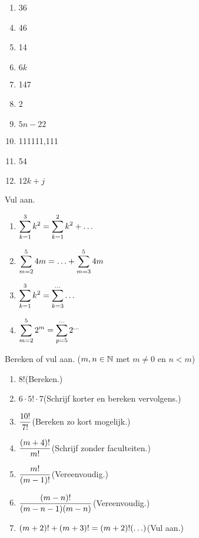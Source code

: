 \documentclass{ximera}
\begin{document}
\begin{oefening2}
\begin{opl}
\begin{minipage}[t]{.24\textwidth}
\begin{enumerate}
\item 36
\end{enumerate}
\end{minipage}
\begin{minipage}[t]{.24\textwidth}
\begin{enumerate}\setcounter{enumi}{3}
\item 46
\item 14
\item $6k$
\end{enumerate}
\end{minipage}
\begin{minipage}[t]{.27\textwidth}
\begin{enumerate}\setcounter{enumi}{6}
\item 147
\item 2
\item $5n-22$
\end{enumerate}
\end{minipage}
\begin{minipage}[t]{.25\textwidth}
\begin{enumerate}\setcounter{enumi}{9}
\item 111111,111
\item 54
\item $12k+j$
\end{enumerate}
\end{minipage}
\end{opl}


\end{oefening2}


\begin{oefening2}
Vul aan.
\begin{enumerate}
\item $\displaystyle{\sum^3_{k=1}k^2=\sum^2_{k=1}k^2+\ldots}$
\item $\displaystyle{\sum^5_{m=2}4m=\ldots+\sum^5_{m=3}4m}$
\item $\displaystyle{\sum^3_{k=1}k^2=\sum^{\ldots}_{k=3}\ldots}$
\item $\displaystyle{\sum^5_{m=2}2^m=\sum^{\ldots}_{p=5}2^{\ldots}}$
\end{enumerate}
\end{oefening2}

\begin{oefening2} Bereken of vul aan. ($m,n\in\mathbb{N}$ met $m\neq 0$ en $n<m$)
\begin{enumerate}
\item $8!$\quad(Bereken.)
\item $6\cdot5!\cdot 7$\quad(Schrijf korter en bereken vervolgens.)
\item $\displaystyle{\frac{10!}{7!}}$\quad(Bereken zo kort mogelijk.)
\item $\displaystyle{\frac{(m+4)!}{m!}}$\quad(Schrijf zonder faculteiten.)
\item $\displaystyle{\frac{m!}{(m-1)!}}$\quad(Vereenvoudig.)
\item $\displaystyle{\frac{(m-n)!}{(m-n-1)(m-n)}}$\quad(Vereenvoudig.)
\item $\displaystyle{(m+2)!+(m+3)!=(m+2)!(\ldots)}$\quad(Vul aan.)
\end{enumerate}
\end{oefening2}
\end{document}
